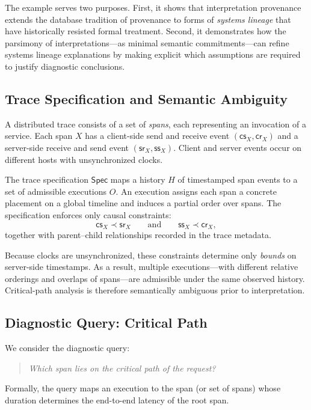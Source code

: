 \documentclass[acmsmall,nonacm]{acmart}
\theoremstyle{remark}
\numberwithin{definition}{section}
\numberwithin{theorem}{section}
\numberwithin{lemma}{section}
\numberwithin{corollary}{section}
\numberwithin{remark}{section}
\numberwithin{example}{section}
\numberwithin{observation}{section}
\numberwithin{assumption}{section}
\newcommand{\Spec}{\mathsf{Spec}}
\begin{document}
The example serves two purposes.
First, it shows that interpretation provenance extends the database tradition of
provenance to forms of \emph{systems lineage} that have historically resisted
formal treatment.
Second, it demonstrates how the parsimony of interpretations---as minimal semantic
commitments---can refine systems lineage explanations by making explicit which
assumptions are required to justify diagnostic conclusions.

\subsection{Trace Specification and Semantic Ambiguity}

A distributed trace consists of a set of \emph{spans}, each representing an
invocation of a service.
Each span $X$ has a client-side send and receive event
$(\mathsf{cs}_X,\mathsf{cr}_X)$ and a server-side receive and send event
$(\mathsf{sr}_X,\mathsf{ss}_X)$.
Client and server events occur on different hosts with unsynchronized clocks.

The trace specification $\Spec$ maps a history $H$ of timestamped span events to a
set of admissible executions $O$.
An execution assigns each span a concrete placement on a global timeline and
induces a partial order over spans.
The specification enforces only causal constraints:
\[
  \mathsf{cs}_X \prec \mathsf{sr}_X
  \qquad\text{and}\qquad
  \mathsf{ss}_X \prec \mathsf{cr}_X ,
\]
together with parent--child relationships recorded in the trace metadata.

Because clocks are unsynchronized, these constraints determine only \emph{bounds}
on server-side timestamps.
As a result, multiple executions---with different relative orderings and overlaps
of spans---are admissible under the same observed history.
Critical-path analysis is therefore semantically ambiguous prior to interpretation.

\subsection{Diagnostic Query: Critical Path}

We consider the diagnostic query:
\begin{quote}
\emph{Which span lies on the critical path of the request?}
\end{quote}
Formally, the query maps an execution to the span (or set of spans) whose duration
determines the end-to-end latency of the root span.
\end{document}
